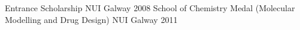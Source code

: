 




\begin{cvhonors}

\cvhonor
{Entrance Scholarship} %
{NUI Galway} %
{} %
{2008} %
\cvhonor
{School of Chemistry Medal (Molecular Modelling and Drug Design)} %
{NUI Galway} %
{} %
{2011} %

\end{cvhonors}


